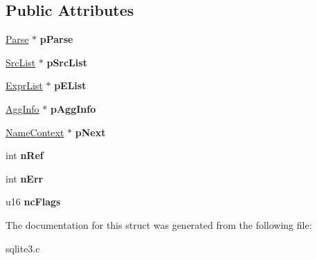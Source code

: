 \subsection*{Public Attributes}
\begin{DoxyCompactItemize}
\item 
\hyperlink{structParse}{Parse} $\ast$ {\bfseries p\+Parse}\hypertarget{structNameContext_a14635249bf75d5e18124089571dd2386}{}\label{structNameContext_a14635249bf75d5e18124089571dd2386}

\item 
\hyperlink{structSrcList}{Src\+List} $\ast$ {\bfseries p\+Src\+List}\hypertarget{structNameContext_a6ede21da33e2e9bd3d0c5fe90a3ec72c}{}\label{structNameContext_a6ede21da33e2e9bd3d0c5fe90a3ec72c}

\item 
\hyperlink{structExprList}{Expr\+List} $\ast$ {\bfseries p\+E\+List}\hypertarget{structNameContext_a8c752d7fb9b28179156c569cc57ba6f2}{}\label{structNameContext_a8c752d7fb9b28179156c569cc57ba6f2}

\item 
\hyperlink{structAggInfo}{Agg\+Info} $\ast$ {\bfseries p\+Agg\+Info}\hypertarget{structNameContext_aeb3ff72c03dd770d421cadc2195a5644}{}\label{structNameContext_aeb3ff72c03dd770d421cadc2195a5644}

\item 
\hyperlink{structNameContext}{Name\+Context} $\ast$ {\bfseries p\+Next}\hypertarget{structNameContext_a82ce0ec8a3cc3d792e1f38bb5e0ad5fc}{}\label{structNameContext_a82ce0ec8a3cc3d792e1f38bb5e0ad5fc}

\item 
int {\bfseries n\+Ref}\hypertarget{structNameContext_ad68616ce2a58fa1b135e0dcf953bdc97}{}\label{structNameContext_ad68616ce2a58fa1b135e0dcf953bdc97}

\item 
int {\bfseries n\+Err}\hypertarget{structNameContext_aba0b89b42e945c4c96d57a8fe011329c}{}\label{structNameContext_aba0b89b42e945c4c96d57a8fe011329c}

\item 
u16 {\bfseries nc\+Flags}\hypertarget{structNameContext_af1721ec037371cabc7385822cbd9629a}{}\label{structNameContext_af1721ec037371cabc7385822cbd9629a}

\end{DoxyCompactItemize}


The documentation for this struct was generated from the following file\+:\begin{DoxyCompactItemize}
\item 
sqlite3.\+c\end{DoxyCompactItemize}
